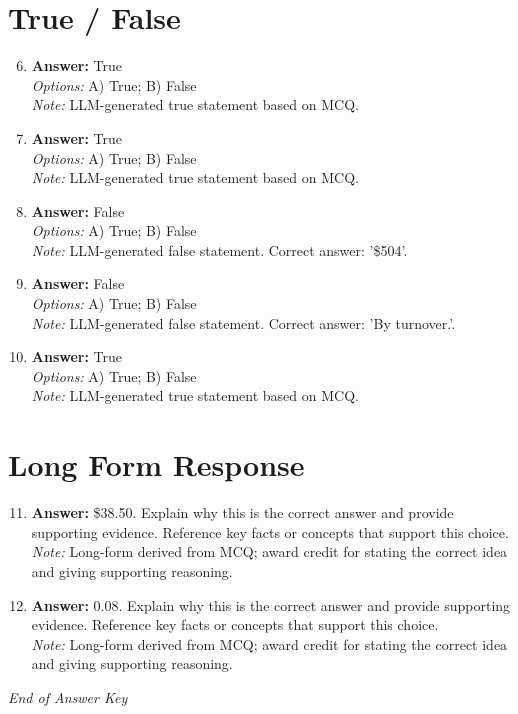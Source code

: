 \documentclass[12pt]{article}
\begin{document}
\section*{True / False}
\begin{enumerate}[label=\arabic*.]
\setcounter{enumi}{5}
\item \textbf{Answer:} True
\\ \textit{Options:} A) True; B) False
\\ \textit{Note:} LLM-generated true statement based on MCQ.
\item \textbf{Answer:} True
\\ \textit{Options:} A) True; B) False
\\ \textit{Note:} LLM-generated true statement based on MCQ.
\item \textbf{Answer:} False
\\ \textit{Options:} A) True; B) False
\\ \textit{Note:} LLM-generated false statement. Correct answer: '\$504'.
\item \textbf{Answer:} False
\\ \textit{Options:} A) True; B) False
\\ \textit{Note:} LLM-generated false statement. Correct answer: 'By turnover.'.
\item \textbf{Answer:} True
\\ \textit{Options:} A) True; B) False
\\ \textit{Note:} LLM-generated true statement based on MCQ.
\end{enumerate}

\section*{Long Form Response}
\begin{enumerate}[label=\arabic*.]
\setcounter{enumi}{10}
\item \textbf{Answer:} \$38.50. Explain why this is the correct answer and provide supporting evidence. Reference key facts or concepts that support this choice.
\\ \textit{Note:} Long-form derived from MCQ; award credit for stating the correct idea and giving supporting reasoning.
\item \textbf{Answer:} 0.08. Explain why this is the correct answer and provide supporting evidence. Reference key facts or concepts that support this choice.
\\ \textit{Note:} Long-form derived from MCQ; award credit for stating the correct idea and giving supporting reasoning.
\end{enumerate}

\vfill
\noindent\textit{End of Answer Key}
\end{document}
